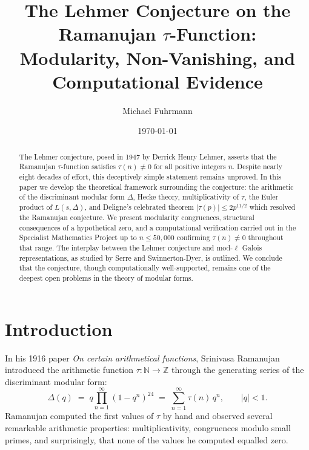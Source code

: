 \documentclass[12pt,a4paper]{amsart}
\author{Michael Fuhrmann}
\date{\today}
\title{The Lehmer Conjecture on the Ramanujan $\tau$-Function:\\
Modularity, Non-Vanishing, and Computational Evidence}
\theoremstyle{definition}
\begin{document}
\begin{abstract}
The Lehmer conjecture, posed in 1947 by Derrick Henry Lehmer, asserts that the
Ramanujan $\tau$-function satisfies $\tau(n) \neq 0$ for all positive integers $n$.
Despite nearly eight decades of effort, this deceptively simple statement remains
unproved. In this paper we develop the theoretical framework surrounding the
conjecture: the arithmetic of the discriminant modular form $\Delta$, Hecke theory,
multiplicativity of $\tau$, the Euler product of $L(s, \Delta)$, and Deligne's
celebrated theorem $|\tau(p)| \leq 2p^{11/2}$ which resolved the Ramanujan
conjecture. We present modularity congruences, structural consequences of a
hypothetical zero, and a computational verification carried out in the Specialist
Mathematics Project up to $n \leq 50{,}000$ confirming $\tau(n) \neq 0$ throughout
that range. The interplay between the Lehmer conjecture and mod-$\ell$ Galois
representations, as studied by Serre and Swinnerton-Dyer, is outlined. We conclude
that the conjecture, though computationally well-supported, remains one of the
deepest open problems in the theory of modular forms.
\end{abstract}

\maketitle

\tableofcontents

\section{Introduction}

In his 1916 paper \emph{On certain arithmetical functions}, Srinivasa Ramanujan
introduced the arithmetic function $\tau : \mathbb{N} \to \mathbb{Z}$ through the
generating series of the discriminant modular form:
\begin{equation}\label{eq:delta-def}
  \Delta(q) \;=\; q \prod_{n=1}^{\infty}(1-q^n)^{24}
  \;=\; \sum_{n=1}^{\infty} \tau(n)\, q^n,
  \qquad |q| < 1.
\end{equation}
Ramanujan computed the first values of $\tau$ by hand and observed several
remarkable arithmetic properties: multiplicativity, congruences modulo small primes,
and surprisingly, that none of the values he computed equalled zero.
\end{document}

